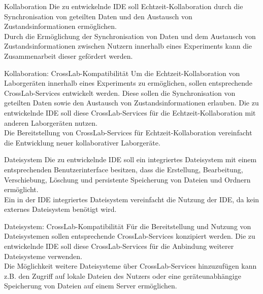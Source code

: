 \begin{requirement}{Kollaboration}
    \reqdescription Die zu entwickelnde IDE soll Echtzeit-Kollaboration durch die Synchronisation von geteilten Daten und den Austausch von Zustandsinformationen ermöglichen. \\
    \reqrationale Durch die Ermöglichung der Synchronisation von Daten und dem Austausch von Zustandsinformationen zwischen Nutzern innerhalb eines Experiments kann die Zusammenarbeit dieser gefördert werden. \\
\end{requirement}

\begin{requirement}{Kollaboration: CrossLab-Kompatibilität}
    \reqdescription Um die Echtzeit-Kollaboration von Laborgeräten innerhalb eines Experiments zu ermöglichen, sollen entsprechende CrossLab-Services entwickelt werden. Diese sollen die Synchronisation von geteilten Daten sowie den Austausch von Zustandsinformationen erlauben. Die zu entwickelnde IDE soll diese CrossLab-Services für die Echtzeit-Kollaboration mit anderen Laborgeräten nutzen. \\
    \reqrationale Die Bereitstellung von CrossLab-Services für Echtzeit-Kollaboration vereinfacht die Entwicklung neuer kollaborativer Laborgeräte. \\
\end{requirement}

\begin{requirement}{Dateisystem}
    \reqdescription Die zu entwickelnde IDE soll ein integriertes Dateisystem mit einem entsprechenden Benutzerinterface besitzen, dass die Erstellung, Bearbeitung, Verschiebung, Löschung und persistente Speicherung von Dateien und Ordnern ermöglicht. \\
    \reqrationale Ein in der IDE integriertes Dateisystem vereinfacht die Nutzung der IDE, da kein externes Dateisystem benötigt wird. \\
\end{requirement}

\begin{requirement}{Dateisystem: CrossLab-Kompatibilität}
    \reqdescription Für die Bereitstellung und Nutzung von Dateisystemen sollen entsprechende CrossLab-Services konzipiert werden. Die zu entwickelnde IDE soll diese CrossLab-Services für die Anbindung weiterer Dateisysteme verwenden. \\
    \reqrationale Die Möglichkeit weitere Dateisysteme über CrossLab-Services hinzuzufügen kann z.B. den Zugriff auf lokale Dateien des Nutzers oder eine geräteunabhängige Speicherung von Dateien auf einem Server ermöglichen. \\
\end{requirement}

